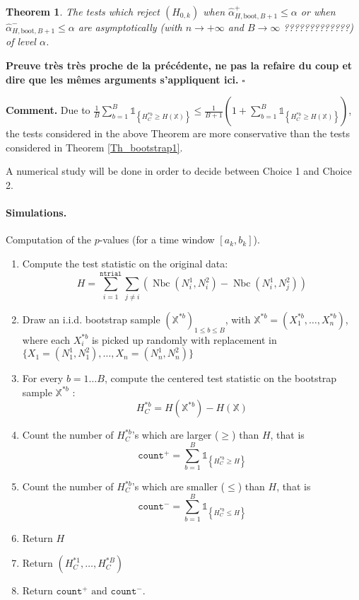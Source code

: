 \documentclass[a4paper,oneside,10pt]{article}
\newtheorem{thm}{Theorem}[subsection]
\newenvironment{dem}{\noindent{\bf Proof :}}{\hfill             %
  $\square$\par \noindent}
\newcommand{\pa}[1]{\ensuremath{\left( #1 \right)}}
\newcommand{\Nbc}{\operatorname{Nbc}}
\newcommand{\X}{\ensuremath{\mathds{X}}}
\newcommand{\1}[1]{\ensuremath{\mathds{1}_{\left\{ #1 \right\}}}}  %
\begin{document}
\begin{thm}
The tests which reject $(H_{0,k})$ when $\hat{\alpha}^+_{H,\textrm{boot},B+1}\leq \alpha$  or when $\hat{\alpha}^-_{H,\textrm{boot},B+1}\leq \alpha$  are  asymptotically  (with $n\to +\infty$ and $B\to\infty$ ?????????????) of level $\alpha$.
\end{thm}

\begin{dem}
{\bf Preuve très très proche de la précédente, ne pas la refaire du coup et dire que les mêmes arguments s'appliquent ici.}
\end{dem}


{\bf Comment.} Due to $\frac{1}{B}\sum_{b=1}^{B} \1{H_C^{* b} \geq H(\X)}\leq\frac{1}{B+1}\pa{1+\sum_{b=1}^B \1{H_C^{* b}\geq H(\X)}}$, the tests considered in the above Theorem are more conservative than the tests considered in Theorem \ref{Th_bootstrap1}.

A numerical study will be done in order to decide between Choice 1 and Choice 2.



\paragraph{Simulations.}
Computation of the $p$-values (for a time window $[a_k,b_k]$).
\begin{enumerate}
\item Compute the test statistic on the original data: 
$$H=\sum_{i=1}^{\texttt{ntrial}} \sum_{j\neq i}\left(\Nbc(N^1_i,N^2_{i})-\Nbc(N_i^1,N_j^2)\right)$$
\item Draw an i.i.d. bootstrap sample $\pa{\X^{* b}}_{1\leq b\leq B}$, with $\X^{* b}=(X_1^{* b},\ldots, X_n^{* b})$, where each $X_i^{* b}$ is picked up randomly with replacement in $\{X_1=(N^1_1,N^2_1),\ldots, X_n=(N^1_n,N^2_n)\}$
\item For every $b=1\ldots B$, compute the centered test statistic on the bootstrap sample $\X^{* b}$ :
$$H_C^{* b}=H(\X^{*b})-H(\X)$$
\item Count the number of $H_C^{* b}$'s which are larger ($\geq$) than $H$, that is
$$\texttt{count}^+=\sum_{b=1}^B \1{H_C^{* b}\geq H}$$
\item Count the number of $H_C^{*  b}$'s which are smaller ($\leq$) than $H$, that is
$$\texttt{count}^-=\sum_{b=1}^B \1{H_C^{* b}\leq H}$$
\item Return $H$
\item Return $(H_C^{* 1},\ldots,H_C^{* B})$
\item Return $\texttt{count}^+\textrm{ and }\texttt{count}^-.$
\end{enumerate}
\end{document}
